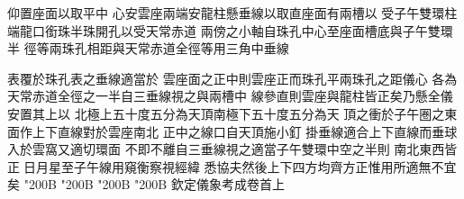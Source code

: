 \begin{正文}
仰置座面以取平中
心安雲座兩端安龍柱懸垂線以取直座面有兩槽以
受子午雙環柱端龍口銜珠半珠開孔以受天常赤道
兩傍之小軸自珠孔中心至座面槽底與子午雙環半
徑等兩珠孔相距與天常赤道全徑等用三角中垂線
\par
表覆於珠孔表之垂線適當於
雲座面之正中則雲座正而珠孔平兩珠孔之距儀心
各為天常赤道全徑之一半自三垂線視之與兩槽中
線參直則雲座與龍柱皆正矣乃懸全儀安置其上以
北極上五十度五分為天頂南極下五十度五分為天
頂之衝於子午圏之東面作上下直線對於雲座南北
正中之線口自天頂施小釘
掛垂線適合上下直線而垂球入於雲窩又適切環面
不即不離自三垂線視之適當子午雙環中空之半則
南北東西皆正𠉀日月星至子午線用窺衡察視經緯
悉協夫然後上下四方均齊方正惟用所適無不宜矣
\char"200B\relax{}
\char"200B\relax{}
\char"200B\relax{}
\char"200B\relax{}
欽定儀象考成卷首上
\par

\par\end{正文}\clearpage
